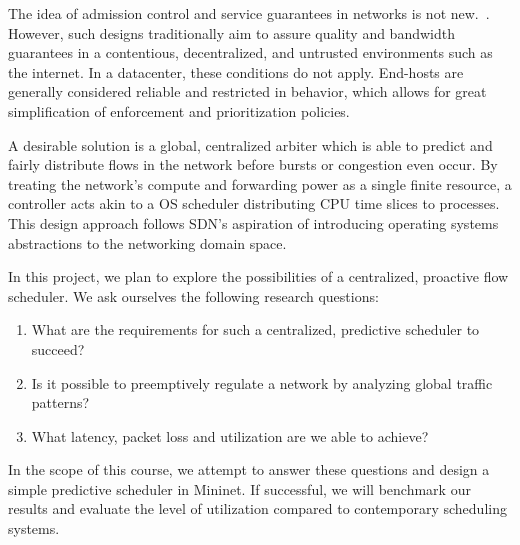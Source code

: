 The idea of admission control and service guarantees in networks is not 
new.~\cite{access_limit, access_limit2}. However, such designs traditionally 
aim to assure quality and bandwidth guarantees in a contentious, decentralized, 
and untrusted environments such as the internet. In a datacenter, these 
conditions do not apply. End-hosts are generally considered reliable and 
restricted in behavior, which allows for great simplification of enforcement 
and prioritization policies.

A desirable solution is a global, centralized arbiter which is able to predict 
and fairly distribute flows in the network before bursts or congestion even 
occur. By treating the network's compute and forwarding power as a single 
finite resource, a controller acts akin to a OS scheduler distributing CPU time 
slices to processes. This design approach follows SDN's aspiration of 
introducing operating systems abstractions to the networking domain space.

In this project, we plan to explore the possibilities of a centralized, 
proactive flow scheduler. We ask ourselves the following research questions:
\begin{enumerate}
    \item What are the requirements for such a centralized, predictive 
    scheduler to succeed?
    \item Is it possible to preemptively regulate a network by analyzing global 
    traffic patterns?
    \item What latency, packet loss and utilization are we able to achieve?
\end{enumerate}

In the scope of this course, we attempt to answer these questions and design a 
simple predictive scheduler in Mininet. If successful, we will benchmark our 
results and evaluate the level of utilization compared to contemporary 
scheduling systems.
